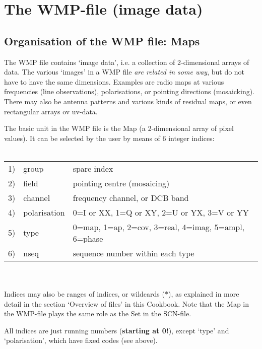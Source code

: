 %
%
%
\chapter{The WMP-file (image data)} 
\tableofcontents 

\section{Organisation of the WMP file: Maps} 
\label{.organ} 

	The \NEWSTAR WMP file contains `image data', i.e.  a collection of
2-dimensional arrays of data.  The various `images' in a WMP file {\it are
related in some way}, but do not have to have the same dimensions.  Examples
are radio maps at various frequencies (line observations), polarisations, or
pointing directions (mosaicking). 
There may also be antenna patterns and various kinds of residual maps, or even
rectangular arrays ov uv-data. 


The basic unit in the WMP file is the Map (a 2-dimensional array of pixel
values). It can be selected by the user by means of 6 integer indices: 
\\ \\
\begin{tabular}{lll} 
1)      &group          &spare index \\ 
2)      &field          &pointing centre (mosaicing) \\ 
3)      &channel        &frequency channel, or DCB band \\ 
4)      &polarisation   &0=I or XX, 1=Q or XY, 2=U or YX, 3=V or YY \\ 
5)      &type           &0=map, 1=ap, 2=cov, 3=real, 4=imag, 5=ampl, 6=phase \\ 
6)      &nseq           &sequence number within each type \\ 
\end{tabular} 
\\ \\
Indices may also be ranges of indices, or wildcards ($\ast$), as explained in
more detail in the section `Overview of \NEWSTAR files' in this Cookbook. 
Note that the Map in the WMP-file plays the same role as the Set in the 
SCN-file. 

	All indices are just running numbers ({\bf starting at 0!}), except
`type' and `polarisation', which have fixed codes (see above). 

